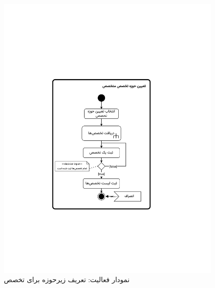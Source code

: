 \begin{figure}
	\centering
	\includegraphics[scale=0.8, page=3]{figs/OOD-activity21-30.pdf}
	\caption{نمودار فعالیت: تعریف زیرحوزه برای تخصص}
\end{figure}
\FloatBarrier
\newpage


